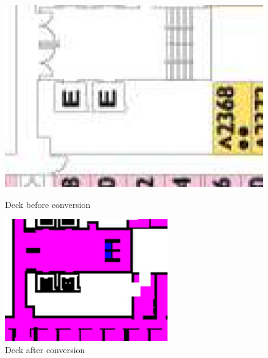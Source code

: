 \documentclass[11pt]{article}
\begin{document}
\begin{figure}[H]
\centering
{\begin{minipage}[t]{7.4cm}
\includegraphics[width=\textwidth]{pics/Decksetup-stairs.pdf}
\caption{Deck before conversion}
\label{Deck-stairs}
\end{minipage}}
{\begin{minipage}[t]{7.4cm}
\includegraphics[width=\textwidth]{pics/deckconversion2.pdf}
\caption{Deck after conversion}
\label{Deck-elevator}
\end{minipage}}
\end{figure}
\end{document}
